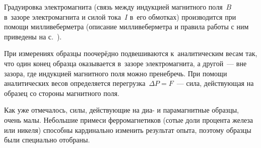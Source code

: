 Градуировка электромагнита (связь между индукцией магнитного поля~$B$ в~зазоре электромагнита и силой тока~$I$ в~его
обмотках) производится при помощи милливеберметра (описание милливеберметра и правила работы с ним приведены на
с.~\pageref{MWB}).

При измерениях образцы поочерёдно подвешиваются к~аналитическим весам так, что один конец образца оказывается в~зазоре
электромагнита, а другой~--- вне зазора, где индукцией магнитного поля можно пренебречь. При помощи аналитических весов
определяется перегрузка~$\Delta P=F$~--- сила, действующая на образец со стороны магнитного поля.

Как уже отмечалось, силы, действующие на диа- и парамагнитные образцы, очень малы. Небольшие примеси ферромагнетиков
(сотые доли процента железа или никеля) способны кардинально изменить результат опыта, поэтому образцы были специально
отобраны.

